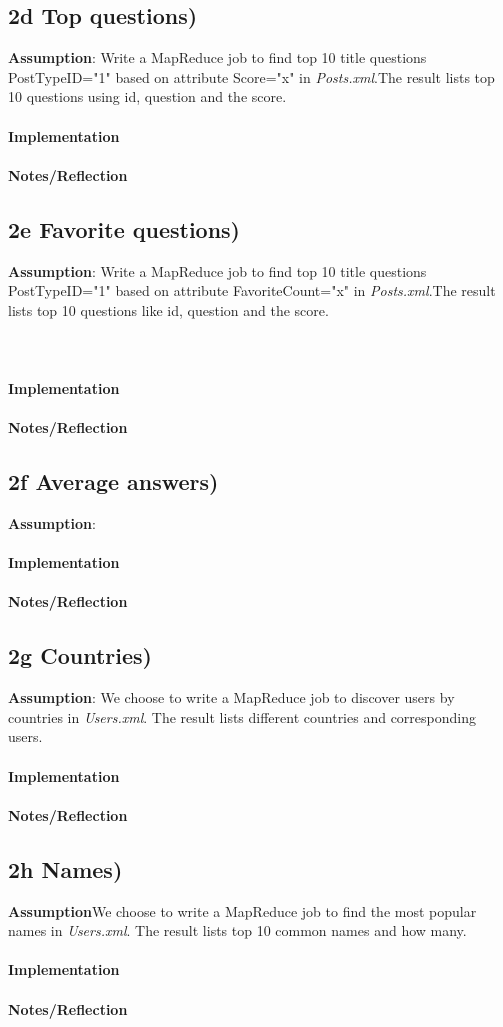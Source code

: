 \documentclass[fleqn,10pt]{wlscirep}
\begin{document}
\subsection*{2d Top questions) }
\textbf{Assumption}: Write a MapReduce job to find top 10 title questions PostTypeID="1"  based on attribute Score="x" in \textit{Posts.xml}.The result lists top 10 questions using id, question and the score.\\ \\
\textbf{Implementation}  \\ \\
\textbf{Notes/Reflection}

\subsection*{2e Favorite questions) }
\textbf{Assumption}: Write a MapReduce job to find top 10 title questions PostTypeID="1"  based on attribute FavoriteCount="x" in \textit{Posts.xml}.The result lists top 10 questions like id, question and the score.\\ \\ \\ \\
\textbf{Implementation}  \\ \\
\textbf{Notes/Reflection}

\subsection*{2f Average answers) }
\textbf{Assumption}: \\ \\
\textbf{Implementation}  \\ \\
\textbf{Notes/Reflection}

\subsection*{2g Countries) }
\textbf{Assumption}: We choose to write a MapReduce job to discover users by countries in \textit{Users.xml}. The result lists different countries and corresponding users. \\ \\
\textbf{Implementation}  \\ \\
\textbf{Notes/Reflection}

\subsection*{2h Names) }
\textbf{Assumption}We choose to write a MapReduce job to find the most popular names in \textit{Users.xml}. The result lists top 10 common names and how many.  \\ \\
\textbf{Implementation}  \\ \\
\textbf{Notes/Reflection}
\end{document}
